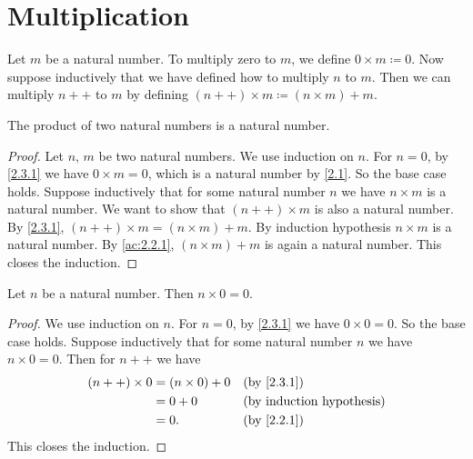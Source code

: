 \section{Multiplication}\label{sec:2.3}

\begin{defn}\label{2.3.1}
  Let \(m\) be a natural number.
  To multiply zero to \(m\), we define \(0 \times m \coloneqq 0\).
  Now suppose inductively that we have defined how to multiply \(n\) to \(m\).
  Then we can multiply \(n++\) to \(m\) by defining \((n++) \times m \coloneqq (n \times m) + m\).
\end{defn}

\begin{ac}\label{ac:2.3.1}
  The product of two natural numbers is a natural number.
\end{ac}

\begin{proof}
  Let \(n\), \(m\) be two natural numbers.
  We use induction on \(n\).
  For \(n = 0\), by \cref{2.3.1} we have \(0 \times m = 0\), which is a natural number by \cref{2.1}.
  So the base case holds.
  Suppose inductively that for some natural number \(n\) we have \(n \times m\) is a natural number.
  We want to show that \((n++) \times m\) is also a natural number.
  By \cref{2.3.1}, \((n++) \times m = (n \times m) + m\).
  By induction hypothesis \(n \times m\) is a natural number.
  By \cref{ac:2.2.1}, \((n \times m) + m\) is again a natural number.
  This closes the induction.
\end{proof}

\begin{ac}\label{ac:2.3.2}
  Let \(n\) be a natural number.
  Then \(n \times 0 = 0\).
\end{ac}

\begin{proof}
  We use induction on \(n\).
  For \(n = 0\), by \cref{2.3.1} we have \(0 \times 0 = 0\).
  So the base case holds.
  Suppose inductively that for some natural number \(n\) we have \(n \times 0 = 0\).
  Then for \(n++\) we have
  \begin{align*}
    (n++) \times 0 & = (n \times 0) + 0 &  & \by{2.3.1} \\
                   & = 0 + 0            &  & \byIH      \\
                   & = 0.               &  & \by{2.2.1}
  \end{align*}
  This closes the induction.
\end{proof}

